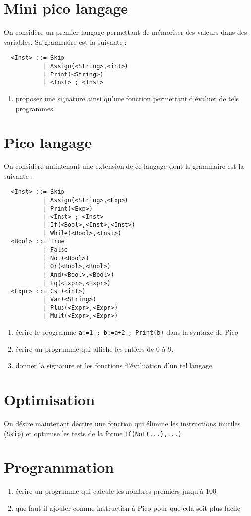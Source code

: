 \documentclass[11pt]{article}
\begin{document}
\section{Mini pico langage}
On considère un premier langage permettant de mémoriser des valeurs dans des variables. Sa grammaire est la suivante :
\begin{verbatim}
  <Inst> ::= Skip
           | Assign(<String>,<int>)
           | Print(<String>)
           | <Inst> ; <Inst>
\end{verbatim}

\begin{enumerate}
\item proposer une signature ainsi qu'une fonction permettant d'évaluer de tels programmes.
\end{enumerate}

\section{Pico langage}
On considère maintenant une extension de ce langage dont la grammaire est la suivante :

\begin{verbatim}
  <Inst> ::= Skip
           | Assign(<String>,<Exp>)
           | Print(<Exp>)
           | <Inst> ; <Inst>
           | If(<Bool>,<Inst>,<Inst>)
           | While(<Bool>,<Inst>)
  <Bool> ::= True
           | False
           | Not(<Bool>)
           | Or(<Bool>,<Bool>)
           | And(<Bool>,<Bool>)
           | Eq(<Expr>,<Expr>)
  <Expr> ::= Cst(<int>)
           | Var(<String>)
           | Plus(<Expr>,<Expr>)
           | Mult(<Expr>,<Expr>)
\end{verbatim}

\begin{enumerate}
\item écrire le programme \texttt{a:=1 ; b:=a+2 ; Print(b)} dans la syntaxe de Pico
\item écrire un programme qui affiche les entiers de 0 à 9.
\item donner la signature et les fonctions d'évaluation d'un tel langage
\end{enumerate}

\section{Optimisation}
On désire maintenant décrire une fonction qui élimine les instructions inutiles
(\texttt{Skip}) et optimise les tests de la forme \texttt{If(Not(...),...)} 

\section{Programmation}
\begin{enumerate}
\item écrire un programme qui calcule les nombres premiers jusqu'à 100
\item que faut-il ajouter comme instruction à Pico pour que cela soit plus facile
\end{enumerate}
\end{document}
